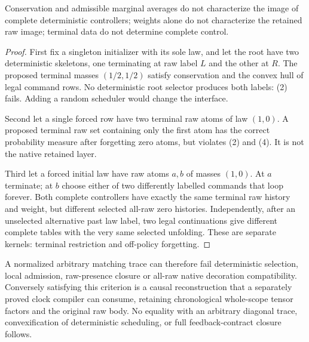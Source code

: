 \documentclass[11pt]{article}
\begin{document}
\begin{proposition}
Conservation and admissible marginal averages do not characterize the image of complete deterministic controllers; weights alone do not characterize the retained raw image; terminal data do not determine complete control.
\end{proposition}
\begin{proof}
First fix a singleton initializer with its sole law, and let the root have two deterministic skeletons, one terminating at raw label $L$ and the other at $R$. The proposed terminal masses $(1/2,1/2)$ satisfy conservation and the convex hull of legal command rows. No deterministic root selector produces both labels: (2) fails. Adding a random scheduler would change the interface.

Second let a single forced row have two terminal raw atoms of law $(1,0)$. A proposed terminal raw set containing only the first atom has the correct probability measure after forgetting zero atoms, but violates (2) and (4). It is not the native retained layer.

Third let a forced initial law have raw atoms $a,b$ of masses $(1,0)$. At $a$ terminate; at $b$ choose either of two differently labelled commands that loop forever. Both complete controllers have exactly the same terminal raw history and weight, but different selected all-raw zero histories. Independently, after an unselected alternative past law label, two legal continuations give different complete tables with the very same selected unfolding. These are separate kernels: terminal restriction and off-policy forgetting.
\end{proof}

A normalized arbitrary matching trace can therefore fail deterministic selection, local admission, raw-presence closure or all-raw native decoration compatibility. Conversely satisfying this criterion is a causal reconstruction that a separately proved clock compiler can consume, retaining chronological whole-scope tensor factors and the original raw body. No equality with an arbitrary diagonal trace, convexification of deterministic scheduling, or full feedback-contract closure follows.
\end{document}
